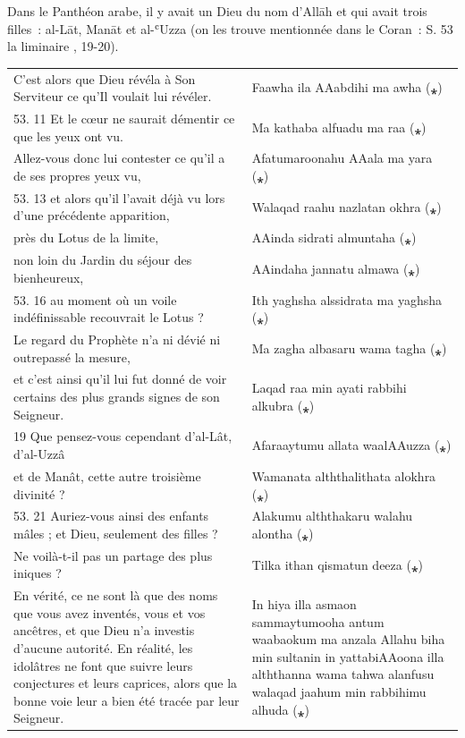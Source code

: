 Dans le Panthéon arabe, il y avait un Dieu du nom d'Allāh et qui avait
trois filles~: al-Lāt, Manāt et al-ʿUzza (on les trouve mentionnée dans
le Coran~: S. 53 la liminaire , 19-20).

\begin{table}[h!]
    \centering
    \small
   \begin{tabular}{p{}p{}}
\toprule
C'est alors que Dieu révéla à Son Serviteur ce qu'Il voulait lui
révéler. & Faawha ila AAabdihi ma awha (⁎) \\
53. 11 Et le cœur ne saurait démentir ce que les yeux ont vu. & Ma
kathaba alfuadu ma raa (⁎) \\
Allez-vous donc lui contester ce qu'il a de ses propres yeux vu, &
Afatumaroonahu AAala ma yara (⁎) \\
53. 13 et alors qu'il l'avait déjà vu lors d'une précédente apparition,
& Walaqad raahu nazlatan okhra (⁎) \\
près du Lotus de la limite, & AAinda sidrati almuntaha (⁎) \\
non loin du Jardin du séjour des bienheureux, & AAindaha jannatu almawa
(⁎) \\
53. 16 au moment où un voile indéfinissable recouvrait le Lotus ? & Ith
yaghsha alssidrata ma yaghsha (⁎) \\
Le regard du Prophète n'a ni dévié ni outrepassé la mesure, & Ma zagha
albasaru wama tagha (⁎) \\
et c'est ainsi qu'il lui fut donné de voir certains des plus grands
signes de son Seigneur. & Laqad raa min ayati rabbihi alkubra (⁎) \\
19 Que pensez-vous cependant d'al-Lât, d'al-Uzzâ & Afaraaytumu allata
waalAAuzza (⁎) \\
et de Manât, cette autre troisième divinité ? & Wamanata alththalithata
alokhra (⁎) \\
53. 21 Auriez-vous ainsi des enfants mâles ; et Dieu, seulement des
filles ? & Alakumu alththakaru walahu alontha (⁎) \\
Ne voilà-t-il pas un partage des plus iniques ? & Tilka ithan qismatun
deeza (⁎) \\
En vérité, ce ne sont là que des noms que vous avez inventés, vous et
vos ancêtres, et que Dieu n'a investis d'aucune autorité. En réalité,
les idolâtres ne font que suivre leurs conjectures et leurs caprices,
alors que la bonne voie leur a bien été tracée par leur Seigneur. & In
hiya illa asmaon sammaytumooha antum waabaokum ma anzala Allahu biha min
sultanin in yattabiAAoona illa alththanna wama tahwa alanfusu walaqad
jaahum min rabbihimu alhuda (⁎) \\
\bottomrule
\end{tabular}
\end{table}

